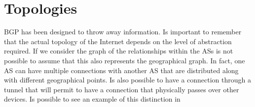 \section{Topologies}
\label{sec:topologies}

%

\ac{BGP} has been designed to throw away information.
Is important to remember that the actual topology of the Internet depends on the
level of abstraction required.
If we consider the graph of the relationships within the \acp{AS} is not
possible to assume that this also represents the geographical graph.
In fact, one \ac{AS} can have multiple connections with another \ac{AS}
that are distributed along with different geographical points.
Is also possible to have a connection through a tunnel that will permit to have
a connection that physically passes over other devices.
Is possible to see an example of this distinction in 

